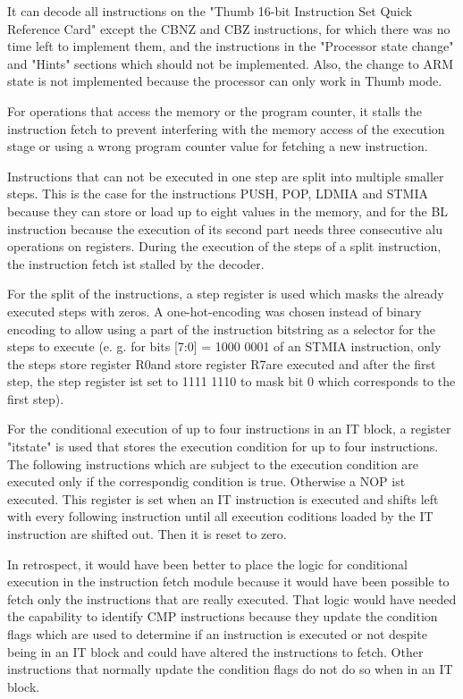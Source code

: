 It can decode all instructions on the "Thumb 16-bit Instruction Set Quick Reference Card" except the CBNZ and CBZ instructions, for which there was no time left to implement them, and the instructions in the "Processor state change" and "Hints" sections which should not be implemented. Also, the change to ARM state is not implemented because the processor can only work in Thumb mode.

For operations that access the memory or the program counter, it stalls the instruction fetch to prevent interfering with the memory access of the execution stage or using a wrong program counter value for fetching a new instruction. 

Instructions that can not be executed in one step are split into multiple smaller steps. This is the case for the instructions PUSH, POP, LDMIA and STMIA because they can store or load up to eight values in the memory, and for the BL instruction because the execution of its second part needs three consecutive alu operations on registers. During the execution of the steps of a split instruction, the instruction fetch ist stalled by the decoder.

For the split of the instructions, a step register is used which masks the already executed steps with zeros. A one-hot-encoding was chosen instead of binary encoding to allow using a part of the instruction bitstring as a selector for the steps to execute (e. g. for bits [7:0] = 1000 0001 of an STMIA instruction, only the steps \glqq store register R0\grqq and \glqq store register R7\grqq are executed and after the first step, the step register ist set to 1111 1110 to mask bit 0 which corresponds to the first step).

For the conditional execution of up to four instructions in an IT block, a register "itstate" is used that stores the execution condition for up to four instructions. The following instructions which are subject to the execution condition are executed only if the correspondig condition is true. Otherwise a NOP ist executed. This register is set when an IT instruction is executed and shifts left with every following instruction until all execution coditions loaded by the IT instruction are shifted out. Then it is reset to zero. 


In retrospect, it would have been better to place the logic for conditional execution in the instruction fetch module because it would have been possible to fetch only the instructions that are really executed. That logic would have needed the capability to identify CMP instructions because they update the condition flags which are used to determine if an instruction is executed or not despite being in an IT block and could have altered the instructions to fetch. Other instructions that normally update the condition flags do not do so when in an IT block.

